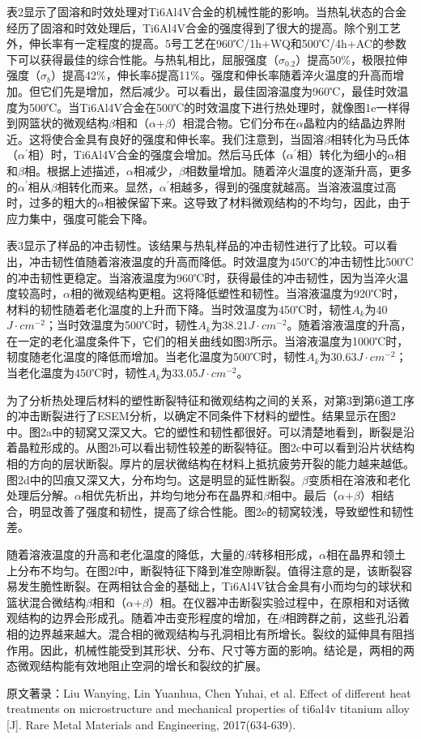 表2显示了固溶和时效处理对Ti6Al4V合金的机械性能的影响。当热轧状态的合金经历了固溶和时效处理后，Ti6Al4V合金的强度得到了很大的提高。除个别工艺外，伸长率有一定程度的提高。5号工艺在960℃/1h+WQ和500℃/4h+AC的参数下可以获得最佳的综合性能。与热轧相比，屈服强度（$\sigma_{0.2}$）提高50\%，极限拉伸强度（$\sigma_b$）提高42\%，伸长率δ提高11\%。强度和伸长率随着淬火温度的升高而增加。但它们先是增加，然后减少。可以看出，最佳固溶温度为960℃，最佳时效温度为500℃。当Ti6Al4V合金在500℃的时效温度下进行热处理时，就像图1e一样得到网篮状的微观结构$\beta$相和（$\alpha$+$\beta$）相混合物。它们分布在$\alpha$晶粒内的结晶边界附近。这将使合金具有良好的强度和伸长率。我们注意到，当固溶$\beta$相转化为马氏体（$\alpha^\prime$相）时，Ti6Al4V合金的强度会增加。然后马氏体（$\alpha^\prime$相）转化为细小的$\alpha$相和$\beta$相。根据上述描述，$\alpha$相减少，$\beta$相数量增加。随着淬火温度的逐渐升高，更多的$\alpha^\prime$相从$\beta$相转化而来。显然，$\alpha^\prime$相越多，得到的强度就越高。当溶液温度过高时，过多的粗大的$\alpha$相被保留下来。这导致了材料微观结构的不均匀，因此，由于应力集中，强度可能会下降。



表3显示了样品的冲击韧性。该结果与热轧样品的冲击韧性进行了比较。可以看出，冲击韧性值随着溶液温度的升高而降低。时效温度为450℃的冲击韧性比500℃的冲击韧性更稳定。当溶液温度为960℃时，获得最佳的冲击韧性，因为当淬火温度较高时，$\alpha$相的微观结构更粗。这将降低塑性和韧性。当溶液温度为920℃时，材料的韧性随着老化温度的上升而下降。当时效温度为450℃时，韧性$A_k$为40$J·cm^{-2}$；当时效温度为500℃时，韧性$A_k$为38.21$J·cm^{-2}$。随着溶液温度的升高，在一定的老化温度条件下，它们的相关曲线如图3所示。当溶液温度为1000℃时，韧度随老化温度的降低而增加。当老化温度为500℃时，韧性$A_k$为30.63$J·cm^{-2}$；当老化温度为450℃时，韧性$A_k$为33.05$J·cm^{-2}$。

为了分析热处理后材料的塑性断裂特征和微观结构之间的关系，对第3到第6道工序的冲击断裂进行了ESEM分析，以确定不同条件下材料的塑性。结果显示在图2中。图2a中的韧窝又深又大。它的塑性和韧性都很好。可以清楚地看到，断裂是沿着晶粒形成的。从图2b可以看出韧性较差的断裂特征。图2c中可以看到沿片状结构相的方向的层状断裂。厚片的层状微结构在材料上抵抗疲劳开裂的能力越来越低。图2d中的凹痕又深又大，分布均匀。这是明显的延性断裂。$\beta$变质相在溶液和老化处理后分解。$\alpha$相优先析出，并均匀地分布在晶界和$\beta$相中。最后（$\alpha$+$\beta$）相结合，明显改善了强度和韧性，提高了综合性能。图2e的韧窝较浅，导致塑性和韧性差。


随着溶液温度的升高和老化温度的降低，大量的$\beta$转移相形成，$\alpha$相在晶界和领土上分布不均匀。在图2f中，断裂特征下降到准空隙断裂。值得注意的是，该断裂容易发生脆性断裂。在两相钛合金的基础上，Ti6Al4V钛合金具有小而均匀的球状和篮状混合微结构$\beta$相和（$\alpha$+$\beta$）相。在仪器冲击断裂实验过程中，在原相和对话微观结构的边界会形成孔。随着冲击变形程度的增加，在$\beta$相跨群之前，这些孔沿着相的边界越来越大。混合相的微观结构与孔洞相比有所增长。裂纹的延伸具有阻挡作用。因此，机械性能受到其形状、分布、尺寸等方面的影响。结论是，两相的两态微观结构能有效地阻止空洞的增长和裂纹的扩展。

	原文著录：Liu Wanying, Lin Yuanhua, Chen Yuhai, et al. Effect of different heat treatments on microstructure and mechanical properties of ti6al4v titanium alloy  [J]. Rare Metal Materials and Engineering, 2017(634-639).

